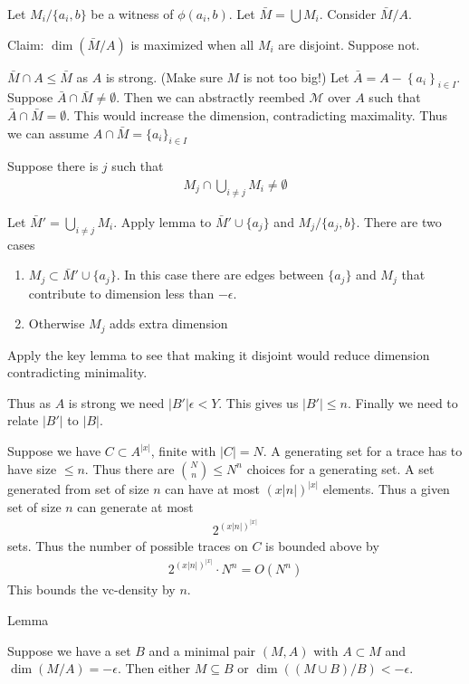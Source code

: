 \documentclass{amsart}
\newcommand{\M}{\mathcal M}
\newcommand{\curly}[1]{\left\{#1\right\}}
\begin{document}
Let $M_i / \{a_i, b\}$ be a witness of $\phi(a_i, b)$.
Let $\bar M = \bigcup M_i$.
Consider $\bar M / A$.

Claim: $\dim(\bar M / A)$ is maximized when all $M_i$ are disjoint.
Suppose not.

$\bar M \cap A \leq \bar M$ as $A$ is strong. (Make sure $M$ is not too big!)
Let $\bar A = A - \curly{a_i}_{i \in I}$.
Suppose $\bar A \cap \bar M \neq \emptyset$.
Then we can abstractly reembed $\M$ over $A$ such that $\bar A \cap \bar M = \emptyset$.
This would increase the dimension, contradicting maximality.
Thus we can assume $A \cap \bar M = \{a_i\}_{i \in I}$

Suppose there is $j$ such that
\begin{align*}
	M_j \cap \bigcup_{i \neq j} M_i \neq \emptyset
\end{align*}

Let $\bar M' = \bigcup_{i \neq j} M_i$.
Apply lemma to $\bar M' \cup \{a_j\}$ and $M_j / \{a_j, b\}$.
There are two cases
\begin{enumerate}
	\item $M_j \subset \bar M' \cup \{a_j\}$.
	In this case there are edges between $\{a_j\}$ and $M_j$ that contribute to dimension less than $-\epsilon$.
	\item Otherwise $M_j$ adds extra dimension 
\end{enumerate}

Apply the key lemma to see that making it disjoint would reduce dimension contradicting minimality.

Thus as $A$ is strong we need $|B'| \epsilon < Y$.
This gives us $|B'| \leq n$.
Finally we need to relate $|B'|$ to $|B|$.

Suppose we have $C \subset A^{|x|}$, finite with $|C| = N$.
A generating set for a trace has to have size $\leq n$.
Thus there are ${N \choose n} \leq N^n$ choices for a generating set.
A set generated from set of size $n$ can have at most $(x|n|)^{|x|}$ elements.
Thus a given set of size $n$ can generate at most
\begin{align*}
	2^{(x|n|)^{|x|}}
\end{align*}
sets.
Thus the number of possible traces on $C$ is bounded above by
\begin{align*}
  2^{(x|n|)^{|x|}} \cdot N^n = O(N^n)
\end{align*}
This bounds the vc-density by $n$.

Lemma

Suppose we have a set $B$ and a minimal pair $(M, A)$ with $A \subset M$ and $\dim(M/A) = -\epsilon$.
Then either $M \subseteq B$ or $\dim((M \cup B)/B) < -\epsilon$.
\end{document}
